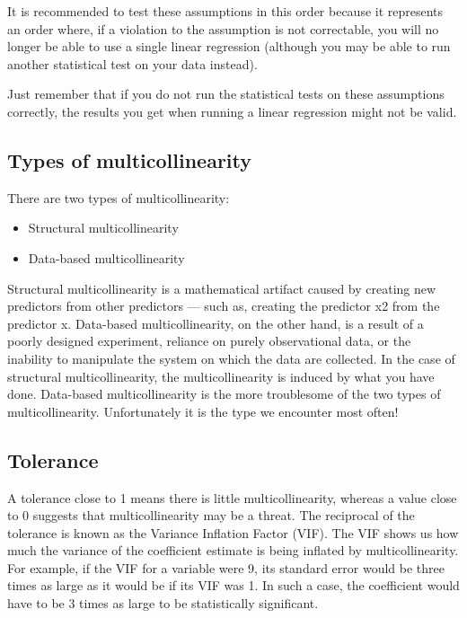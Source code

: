 \documentclass[11pt]{article} %
\begin{document}
It is recommended to test these assumptions in this order because it represents an order where, if a violation to the assumption is not correctable, you will no longer be able to use a single linear regression (although you may be able to run another statistical test on your data instead). 

Just remember that if you do not run the statistical tests on these assumptions correctly, the results you get when running a linear regression might not be valid.

\subsection{Types of multicollinearity}


There are two types of multicollinearity: 
\begin{itemize}
\item Structural multicollinearity
\item Data-based multicollinearity
\end{itemize}
Structural multicollinearity is a mathematical artifact caused by creating new predictors from other predictors — such as, creating the predictor x2 from the predictor x. 
Data-based multicollinearity, on the other hand, is a result of a poorly designed experiment, reliance on purely observational data, or the inability to manipulate the system on which the data are collected. 
In the case of structural multicollinearity, the multicollinearity is induced by what you have done. Data-based multicollinearity is the more troublesome of the two types of multicollinearity. Unfortunately it is the type we encounter most often!


\newpage
 


\subsection{Tolerance}
A tolerance close to 1 means there is little multicollinearity, whereas a value close to 0 suggests that multicollinearity may be a threat. The reciprocal of the tolerance is known as the Variance Inflation Factor (VIF). The VIF shows us how much the variance of the coefficient estimate is being inflated by multicollinearity. For example, if the VIF for a variable were 9, its standard error would be three times as large as it would be if its VIF was 1. In such a case, the coefficient would have to be 3 times as large to be statistically significant.
\end{document}
